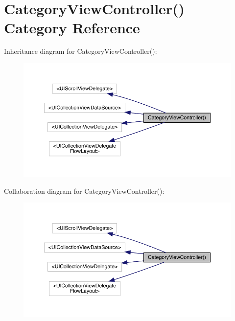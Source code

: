 \hypertarget{category_category_view_controller_07_08}{}\section{Category\+View\+Controller() Category Reference}
\label{category_category_view_controller_07_08}


Inheritance diagram for Category\+View\+Controller()\+:\nopagebreak
\begin{figure}[H]
\begin{center}
\leavevmode
\includegraphics[width=350pt]{category_category_view_controller_07_08__inherit__graph}
\end{center}
\end{figure}


Collaboration diagram for Category\+View\+Controller()\+:\nopagebreak
\begin{figure}[H]
\begin{center}
\leavevmode
\includegraphics[width=350pt]{category_category_view_controller_07_08__coll__graph}
\end{center}
\end{figure}
